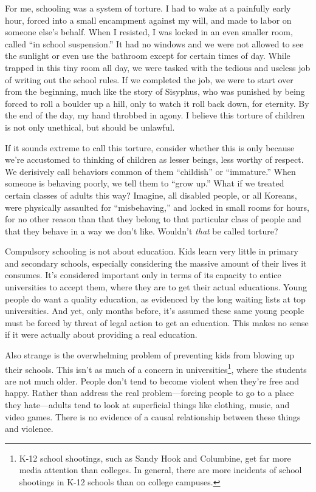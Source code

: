 For me, schooling was a system of torture. I had to wake at a painfully early hour, forced into a small encampment against my will, and made to labor on someone else's behalf. When I resisted, I was locked in an even smaller room, called ``in school suspension.'' It had no windows and we were not allowed to see the sunlight or even use the bathroom except for certain times of day. While trapped in this tiny room all day, we were tasked with the tedious and useless job of writing out the school rules. If we completed the job, we were to start over from the beginning, much like the story of Sisyphus, who was punished by being forced to roll a boulder up a hill, only to watch it roll back down, for eternity. By the end of the day, my hand throbbed in agony. I believe this torture of children is not only unethical, but should be unlawful.

If it sounds extreme to call this torture, consider whether this is only because we're accustomed to thinking of children as lesser beings, less worthy of respect. We derisively call behaviors common of them ``childish'' or ``immature.'' When someone is behaving poorly, we tell them to ``grow up.'' What if we treated certain classes of adults this way? Imagine, all disabled people, or all Koreans, were physically assaulted for ``misbehaving,'' and locked in small rooms for hours, for no other reason than that they belong to that particular class of people and that they behave in a way we don't like. Wouldn't \emph{that} be called torture?

Compulsory schooling is not about education. Kids learn very little in primary and secondary schools, especially considering the massive amount of their lives it consumes. It's considered important only in terms of its capacity to entice universities to accept them, where they are to get their actual educations. Young people do want a quality education, as evidenced by the long waiting lists at top universities. And yet, only months before, it's assumed these same young people must be forced by threat of legal action to get an education. This makes no sense if it were actually about providing a real education.

Also strange is the overwhelming problem of preventing kids from blowing up their schools. This isn't as much of a concern in universities\footnote{K-12 school shootings, such as Sandy Hook and Columbine, get far more media attention than colleges. In general, there are more incidents of school shootings in K-12 schools than on college campuses.\cite{wikipedia-school-shootings}}, where the students are not much older. People don't tend to become violent when they're free and happy. Rather than address the real problem---forcing people to go to a place they hate---adults tend to look at superficial things like clothing, music, and video games. There is no evidence of a causal relationship between these things and violence.


